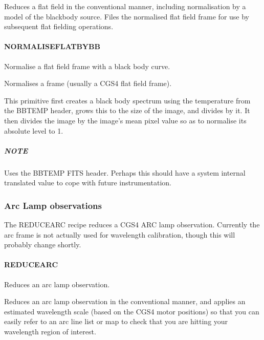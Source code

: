 \documentclass[twoside,11pt]{article}
\renewcommand{\_}{\texttt{\symbol{95}}}
\begin{document}
\mbox{}


Reduces a flat field in the conventional manner, including
normalisation by a model of the blackbody source. Files the normalised
flat field frame for use by subsequent flat fielding operations.


\paragraph{\_NORMALISE\_FLAT\_BY\_BB\_\label{_NORMALISE_FLAT_BY_BB_}}


Normalise a flat field frame with a black body curve.


\mbox{}


Normalises a frame (usually a CGS4 flat field frame).



This primitive first creates a black body spectrum using the temperature
from the BBTEMP header, grows this to the size of the image, and divides by
it. It then divides the image by the image's mean pixel value so as to
normalise its absolute level to 1.

\subparagraph*{NOTE\label{_NORMALISE_FLAT_BY_BB__NOTE}}


Uses the BBTEMP FITS header. Perhaps this should have a system internal
translated value to cope with future instrumentation.


\subsubsection{Arc Lamp observations}

The REDUCE\_ARC recipe reduces a CGS4 ARC lamp observation. Currently
the arc frame is not actually used for wavelength calibration, though
this will probably change shortly.

\paragraph{REDUCE\_ARC\label{REDUCE_ARC}}


Reduces an arc lamp observation.


\mbox{}


Reduces an arc lamp observation in the conventional manner, and
applies an estimated wavelength scale (based on the CGS4 motor
positions) so that you can easily refer to an arc line list or map to
check that you are hitting your wavelength region of interest.
\end{document}
